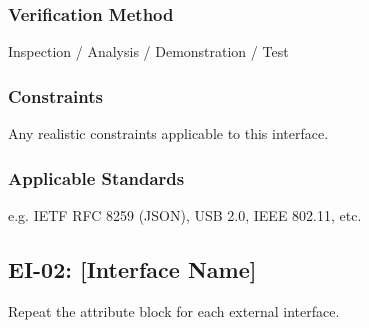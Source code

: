 \subsubsection{Verification Method}
Inspection / Analysis / Demonstration / Test
\subsubsection{Constraints}
Any realistic constraints applicable to this interface.
\subsubsection{Applicable Standards}
e.g. IETF RFC 8259 (JSON), USB 2.0, IEEE 802.11, etc.

\subsection{EI-02: [Interface Name]}
Repeat the attribute block for each external interface.
